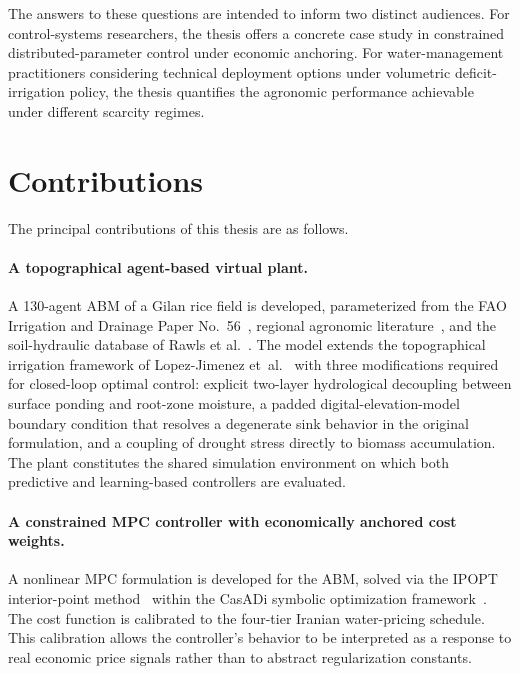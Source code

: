 The answers to these questions are intended to inform two distinct
audiences. For control-systems researchers, the thesis offers a
concrete case study in constrained distributed-parameter control
under economic anchoring. For water-management practitioners
considering technical deployment options under volumetric
deficit-irrigation policy, the thesis quantifies the agronomic
performance achievable under different scarcity regimes.

\section{Contributions}
\label{sec:intro-contributions}

The principal contributions of this thesis are as follows.

\paragraph{A topographical agent-based virtual plant.}
A 130-agent ABM of a Gilan rice field is developed, parameterized from
the FAO Irrigation and Drainage Paper No.~56~\cite{allen1998},
regional agronomic literature~\cite{jalali2021,sadidi2021}, and the
soil-hydraulic database of Rawls et al.~\cite{rawls1982}. The model
extends the topographical irrigation framework of Lopez-Jimenez
et~al.~\cite{Lopezjimenez2024,LopezJimenez2022} with three
modifications required for closed-loop optimal control: explicit
two-layer hydrological decoupling between surface ponding and
root-zone moisture, a padded digital-elevation-model boundary
condition that resolves a degenerate sink behavior in the original
formulation, and a coupling of drought stress directly to biomass
accumulation. The plant constitutes the shared simulation environment
on which both predictive and learning-based controllers are evaluated.

\paragraph{A constrained MPC controller with economically anchored
cost weights.} A nonlinear MPC formulation is developed for the ABM,
solved via the IPOPT interior-point method~\cite{wachter2006ipopt}
within the CasADi symbolic optimization
framework~\cite{andersson2019casadi}. The cost function is calibrated
to the four-tier Iranian water-pricing schedule. This calibration
allows the controller's behavior to be interpreted as a response to
real economic price signals rather than to abstract regularization
constants.

